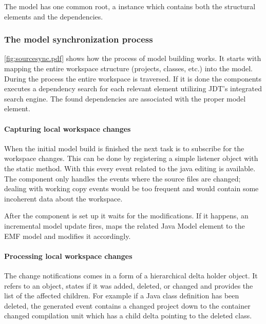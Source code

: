 The model has one common root, a  instance which contains both
the structural elements and the dependencies.

\subsubsection{The model synchronization process}
\autoref{fig:sourcesync.pdf} shows how the process  of model building works. It
starts with mapping the entire workspace structure (projects, classes, etc.)
into the model. During the process the entire workspace is traversed. If it is 
done the components executes a dependency search for each relevant element 
utilizing JDT's integrated search engine. The found dependencies are associated 
with the proper model element.

\paragraph{Capturing local workspace changes}
When the initial model build is finished the next task is to subscribe for the
workspace changes. This can be done by registering a simple listener object with
the   static
method. With this every event related to the java editing is available. The
component only handles the events where the source files are changed; dealing
with working copy events would be too frequent and would contain some incoherent
data about the workspace. 
	
After the component is set up it waits for the modifications. If it happens, an
incremental model update fires, maps the related Java Model element to the EMF
model and modifies it accordingly. 

\paragraph{Processing local workspace changes}
The change notifications comes in a form of a hierarchical delta holder object.
It refers to an object, states if it was added, deleted, or changed and provides
the list of the affected children. For example if a Java class definition has
been deleted, the generated event contains a changed project down to the
container changed compilation unit which has a child delta pointing to the
deleted class.

